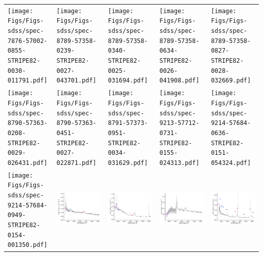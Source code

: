 \begin{center}
\begin{longtable}{l l l l l }
    \texttt{[image: Figs/Figs-sdss/spec-7876-57002-0855-STRIPE82-0030-011791.pdf]} & \texttt{[image: Figs/Figs-sdss/spec-8789-57358-0239-STRIPE82-0027-043701.pdf]} & \texttt{[image: Figs/Figs-sdss/spec-8789-57358-0340-STRIPE82-0025-031694.pdf]} & \texttt{[image: Figs/Figs-sdss/spec-8789-57358-0634-STRIPE82-0026-041908.pdf]} & \texttt{[image: Figs/Figs-sdss/spec-8789-57358-0827-STRIPE82-0028-032669.pdf]} \\
    \texttt{[image: Figs/Figs-sdss/spec-8790-57363-0208-STRIPE82-0029-026431.pdf]} & \texttt{[image: Figs/Figs-sdss/spec-8790-57363-0451-STRIPE82-0027-022871.pdf]} & \texttt{[image: Figs/Figs-sdss/spec-8791-57373-0951-STRIPE82-0034-031629.pdf]} & \texttt{[image: Figs/Figs-sdss/spec-9213-57712-0731-STRIPE82-0155-024313.pdf]} & \texttt{[image: Figs/Figs-sdss/spec-9214-57684-0636-STRIPE82-0151-054324.pdf]} \\
    \texttt{[image: Figs/Figs-sdss/spec-9214-57684-0949-STRIPE82-0154-001350.pdf]} & \includegraphics[width=0.19\linewidth, clip]{Figs/Figs-sdss/spec-9217-57934-0197-STRIPE82-0143-016256.pdf} & \includegraphics[width=0.19\linewidth, clip]{Figs/Figs-sdss/spec-9217-57934-0839-STRIPE82-0143-016137.pdf} & \includegraphics[width=0.19\linewidth, clip]{Figs/Figs-sdss/spec-9218-57724-0804-STRIPE82-0145-045634.pdf} & \includegraphics[width=0.19\linewidth, clip]{Figs/Figs-sdss/spec-9230-58021-0675-STRIPE82-0125-053114.pdf} \\

\end{longtable}
\end{center}
